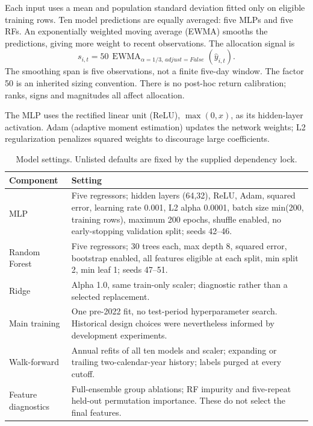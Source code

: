 \documentclass[3p,times]{elsarticle}
\begin{document}
Each input uses a mean and population standard deviation fitted only on eligible training rows. Ten model predictions are equally averaged: five MLPs and five RFs. An exponentially weighted moving average (EWMA) smooths the predictions, giving more weight to recent observations. The allocation signal is
\begin{equation}s_{i,t}=50\,\operatorname{EWMA}_{\alpha=1/3,\,adjust=False}(\widehat y_{i,t}).\end{equation}
The smoothing span is five observations, not a finite five-day window. The factor 50 is an inherited sizing convention. There is no post-hoc return calibration; ranks, signs and magnitudes all affect allocation.

The MLP uses the rectified linear unit (ReLU), $\max(0,x)$, as its hidden-layer activation. Adam (adaptive moment estimation) updates the network weights; L2 regularization penalizes squared weights to discourage large coefficients.

\begin{table}[htbp]\centering\small
\caption{Model settings. Unlisted defaults are fixed by the supplied dependency lock.}\label{tab:models}
\begin{tabularx}{\textwidth}{lX}\toprule
Component & Setting \\\midrule
MLP & Five regressors; hidden layers (64,32), ReLU, Adam, squared error, learning rate 0.001, L2 alpha 0.0001, batch size min(200, training rows), maximum 200 epochs, shuffle enabled, no early-stopping validation split; seeds 42--46. \\
Random Forest & Five regressors; 30 trees each, max depth 8, squared error, bootstrap enabled, all features eligible at each split, min split 2, min leaf 1; seeds 47--51. \\
Ridge & Alpha 1.0, same train-only scaler; diagnostic rather than a selected replacement. \\
Main training & One pre-2022 fit, no test-period hyperparameter search. Historical design choices were nevertheless informed by development experiments. \\
Walk-forward & Annual refits of all ten models and scaler; expanding or trailing two-calendar-year history; labels purged at every cutoff. \\
Feature diagnostics & Full-ensemble group ablations; RF impurity and five-repeat held-out permutation importance. These do not select the final features. \\\bottomrule
\end{tabularx}\end{table}
\end{document}
